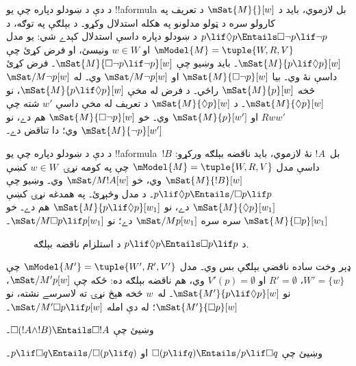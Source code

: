 \documentclass[../../../include/open-logic-section]{subfiles}
\begin{document}
\begin{ex}
  د دې د ښودلو دپاره چې يو !!a{formula} بل لازموي، بايد د
  $\mSat{M}{}[w]$ د تعريف په کارولو سره د ټولو مدلونو په هکله
  استدلال وکړو۔ د بېلګې په توګه، د $p \lif \Diamond p \Entails
  \Box\lnot p \lif \lnot p$ د ښودلو دپاره داسې استدلال کېدے شي:
  يو مدل $\mModel{M} = \tuple{W, R, V}$ او $w \in W$ ونيسئ، او فرض
  کړئ چې $\mSat{M}{p \lif \Diamond p}[w]$۔ بايد وښيو چې
  $\mSat{M}{\Box\lnot p \lif \lnot p}[w]$۔ فرض کړئ داسې نۀ وي۔
  بيا $\mSat{M}{\Box\lnot p}[w]$ او $\mSat/{M}{\lnot p}[w]$ وي۔
  له $\mSat/{M}{\lnot p}[w]$ څخه $\mSat{M}{p}[w]$ راځي۔ د فرض
  له مخې $\mSat{M}{p \lif \Diamond p}[w]$، نو
  $\mSat{M}{\Diamond p}[w]$۔ د $\mSat{M}{\Diamond p}[w]$ د تعريف
  له مخې داسې $w'$ شته چې $Rww'$ او $\mSat{M}{p}[w']$ وي۔ خو
  $\mSat{M}{\Box \lnot p}[w]$ هم دے، نو
  $\mSat{M}{\lnot p}[w']$ وي؛ دا تناقض دے۔

  د دې د ښودلو دپاره چې يو !!a{formula}~$!B$ بل~$!A$ نۀ لازموي،
  بايد ناقضه بېلګه ورکړو: داسې مدل $\mModel{M} = \tuple{W, R, V}$
  چې په کومه نړۍ~$w \in W$ کښې $\mSat{M}{!B}[w]$ وي، خو
  $\mSat/{M}{!A}[w]$ وي۔ وښيو چې $p \lif \Diamond p \Entails/
  \Box p \lif p$۔ د  مدل وڅېړئ۔ په همدغه نړۍ
  کښې $\mSat{M}{\Diamond p}[w_1]$ دے، نو
  $\mSat{M}{p \lif \Diamond p}[w_1]$ هم دے۔ خو
  $\mSat{M}{\Box p}[w_1]$ سره سره $\mSat/{M}{p}[w_1]$ دے؛ نو
  $\mSat/{M}{\Box p \lif p}[w_1]$۔
  \begin{figure}
  \begin{center}
  \end{center}
  \caption{د $p \lif \Diamond p
  \Entails \Box p \lif p$ د استلزام ناقضه بېلګه.}
  \end{figure}
  
  ډېر وخت ساده ناقضې بېلګې بس وي۔ مدل $\mModel{M'} =
  \tuple{W', R', V'}$ چې $W' = \{w\}$، $R' = \emptyset$ او $V'(p) =
  \emptyset$ وي، هم ناقضه بېلګه ده: ځکه چې $\mSat/{M'}{p}[w]$، نو
  $\mSat{M'}{p \lif \Diamond p}[w]$۔ له~$w$ څخه هېڅ نړۍ ته لاسرسے
  نشته، نو $\mSat{M'}{\Box p}[w]$؛ له دې امله
  $\mSat/{M'}{\Box p \lif p}[w]$۔
\end{ex}

\begin{prob}
  وښيئ چې $\Box (!A \land !B) \Entails \Box !A$۔
\end{prob}

\begin{prob}
  وښيئ چې $\Box (p \lif q) \Entails/ p \lif \Box q$ او $p \lif \Box
  q \Entails/\Box (p \lif q)$۔
\end{prob}
\end{document}

